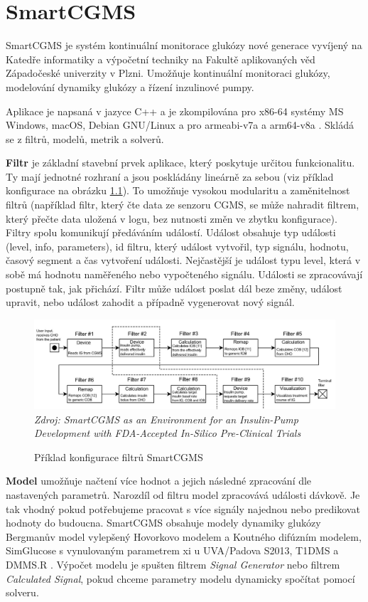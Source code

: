 \chapter{SmartCGMS}
\label{ch:smartcgms}

SmartCGMS je systém kontinuální monitorace glukózy nové generace vyvíjený na Katedře informatiky a výpočetní techniky na Fakultě aplikovaných věd Západočeské univerzity v Plzni. Umožňuje kontinuální monitoraci glukózy, modelování dynamiky glukózy a řízení inzulinové pumpy.

Aplikace je napsaná v jazyce C++ a je zkompilována pro x86-64 systémy MS Windows, macOS, Debian GNU/Linux a pro armeabi-v7a a arm64-v8a \citep{cgms.koutny}. Skládá se z filtrů, modelů, metrik a solverů.

\textbf{Filtr} je základní stavební prvek aplikace, který poskytuje určitou funkcionalitu. Ty mají jednotné rozhraní a jsou poskládány lineárně za sebou (viz příklad konfigurace na obrázku \ref{fig:scgms_filters}). To umožňuje vysokou modularitu a zaměnitelnost filtrů (například filtr, který čte data ze senzoru CGMS, se může nahradit filtrem, který přečte data uložená v logu, bez nutnosti změn ve zbytku konfigurace). Filtry spolu komunikují předáváním událostí. Událost obsahuje typ události (level, info, parameters), id filtru, který událost vytvořil, typ signálu, hodnotu, časový segment a čas vytvoření události. Nejčastější je událost typu level, která v sobě má hodnotu naměřeného nebo vypočteného signálu. Události se zpracovávají postupně tak, jak přichází. Filtr může událost poslat dál beze změny, událost upravit, nebo událost zahodit a případně vygenerovat nový signál.

\begin{figure}[H]
\caption{Příklad konfigurace filtrů SmartCGMS}
\label{fig:scgms_filters}
\centering
\includegraphics[width=1\textwidth]{img/scgms/filters.jpg}
\textit{Zdroj: SmartCGMS as an Environment for an Insulin-Pump  Development with FDA-Accepted In-Silico Pre-Clinical Trials \citep{cgms.ubl}}
\end{figure}

\textbf{Model} umožňuje načtení více hodnot a jejich následné zpracování dle nastavených parametrů. Narozdíl od filtru model zpracovává události dávkově. Je tak vhodný pokud potřebujeme pracovat s více signály najednou nebo predikovat hodnoty do budoucna. SmartCGMS obsahuje modely dynamiky glukózy Bergmanův model vylepšený Hovorkovo modelem a Koutného difúzním modelem, SimGlucose s vynulovaným parametrem xi u UVA/Padova S2013, T1DMS a DMMS.R \citep{cgms.web}. Výpočet modelu je spušten filtrem \textit{Signal Generator} nebo filtrem \textit{Calculated Signal}, pokud chceme  parametry modelu dynamicky spočítat pomocí solveru.

